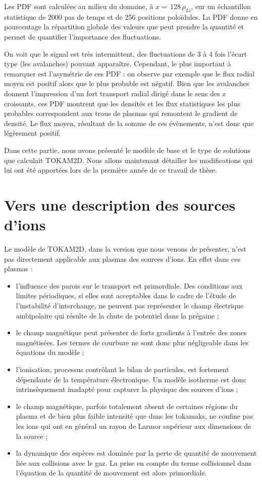 \begin{refsection}
Les PDF
sont calculées au milieu du domaine, à $x=\,$128$\,\rho_{Li}$, sur un
échantillon statistique de 2000 pas de temps et de 256 positions
poloïdales. La PDF donne en pourcentage la répartition globale des valeurs
que peut prendre la quantité et permet de quantifier l'importance des fluctuations.

On voit que le signal est très
intermittent, des fluctuations de 3 à 4 fois l'écart type (les avalanches)
pouvant apparaître. Cependant, le plus important à remarquer est l'asymétrie de
ces PDF :
on observe par exemple que le flux radial moyen est positif alors que le plus
probable est négatif. Bien que
les avalanches donnent l'impression d'un fort transport radial dirigé
dans le sens des $x$ croissants, ces PDF montrent que les densités et les flux
statistiques les plus probables correspondent aux trous de plasmas qui
remontent le gradient de densité. Le flux moyen, résultant de la somme de
ces évènements, n'est donc que légèrement positif.

Dans cette partie, nous avons présenté le modèle de base et le type
de solutions que calculait TOKAM2D. Nous allons maintenant détailler les
modifications qui lui ont été apportées lors de la première année de ce travail
de thèse.

\section{Vers une description des sources d'ions}

Le modèle de TOKAM2D, dans la version que nous venons de présenter, n'est pas
directement applicable aux plasmas des sources d'ions. En effet dans
ces plasmas :

\begin{itemize}
	\item l'influence des parois sur le transport est primordiale. Des conditions
	aux limites périodiques, si elles sont acceptables dans le cadre de l'étude de
	l'instabilité d'interchange, ne peuvent pas représenter le champ électrique
	ambipolaire qui résulte de la chute de potentiel dans la prégaine ;
	\item le champ magnétique peut présenter de forts
	gradients à l'entrée des zones magnétisées. Les termes de courbure ne sont donc
	plus négligeable dans les équations du modèle ;
	\item l'ionisation, processus contrôlant le bilan de particules, est fortement
	dépendante de la température électronique. Un modèle isotherme est donc
	intrinsèquement inadapté pour capturer la physique des sources d'ions  ;
	\item le champ magnétique, parfois totalement absent de certaines régions du
	plasma et de bien plus faible intensité que dans les tokamaks, ne confine pas
	les ions qui ont en général un rayon de Larmor supérieur aux dimensions de la
	source ;
	\item la dynamique des espèces est dominée par la perte de
	quantité de mouvement liée aux collisions avec le gaz. La
	prise en compte du terme collisionnel dans l'équation de la quantité de
	mouvement est alors primordiale.
\end{itemize}


\end{refsection}
